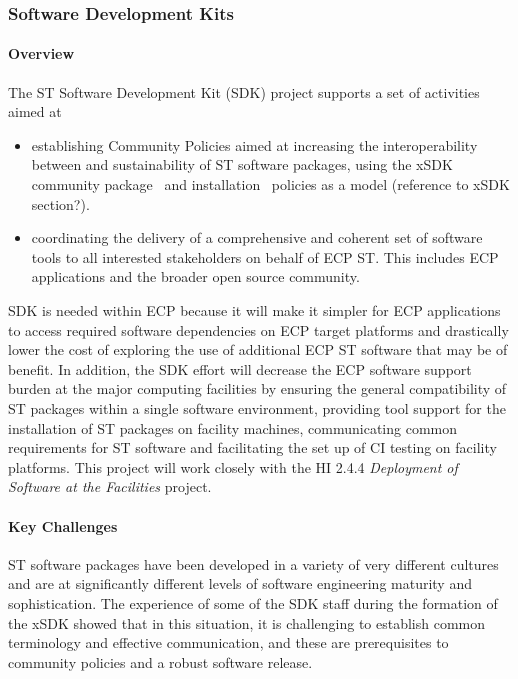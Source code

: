 \subsubsection{Software Development Kits} \label{subsubsect:ecosystem-sdk}

\paragraph{Overview} The ST Software Development Kit (SDK) project supports a set of activities aimed at

\begin{itemize}
\item establishing Community Policies aimed at increasing the interoperability between and sustainability of ST software packages, using the xSDK community package~\cite{xSDK-community-package-policies2016} and installation~\cite{xSDK-community-installation-policies2016} policies as a model (reference to xSDK section?).

\item coordinating the delivery of a comprehensive and coherent set of software tools to all interested stakeholders on behalf of ECP ST. This includes ECP applications and the broader open source community.

\end{itemize}

SDK is needed within ECP because it will make it simpler for ECP applications to access required software dependencies on ECP target platforms and drastically lower the cost of exploring the use of additional ECP ST software that may be of benefit. In addition, the SDK effort will decrease the ECP software support burden at the major computing facilities by ensuring the general compatibility of ST packages within a single software environment, providing tool support for the installation of ST packages on facility machines, communicating common requirements for ST software and facilitating the set up of CI testing on facility platforms. This project will work closely with the HI 2.4.4 \textit{Deployment of Software at the Facilities} project.

\paragraph{Key  Challenges}
ST software packages have been developed in a variety of very different cultures and are at significantly different levels of software engineering maturity and sophistication. The experience of some of the SDK staff during the formation of the xSDK showed that in this situation, it is challenging to establish common terminology and effective communication, and these are prerequisites to community policies and a robust software release.

